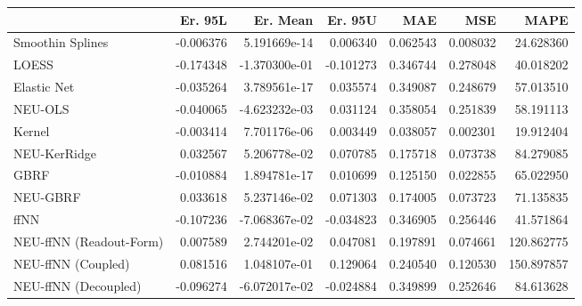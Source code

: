 \begin{tabular}{lrrrrrr}
\toprule
{} &   Er. 95L &      Er. Mean &   Er. 95U &       MAE &       MSE &        MAPE \\
\midrule
Smoothin Splines        & -0.006376 &  5.191669e-14 &  0.006340 &  0.062543 &  0.008032 &   24.628360 \\
LOESS                   & -0.174348 & -1.370300e-01 & -0.101273 &  0.346744 &  0.278048 &   40.018202 \\
Elastic Net             & -0.035264 &  3.789561e-17 &  0.035574 &  0.349087 &  0.248679 &   57.013510 \\
NEU-OLS                 & -0.040065 & -4.623232e-03 &  0.031124 &  0.358054 &  0.251839 &   58.191113 \\
Kernel                  & -0.003414 &  7.701176e-06 &  0.003449 &  0.038057 &  0.002301 &   19.912404 \\
NEU-KerRidge            &  0.032567 &  5.206778e-02 &  0.070785 &  0.175718 &  0.073738 &   84.279085 \\
GBRF                    & -0.010884 &  1.894781e-17 &  0.010699 &  0.125150 &  0.022855 &   65.022950 \\
NEU-GBRF                &  0.033618 &  5.237146e-02 &  0.071303 &  0.174005 &  0.073723 &   71.135835 \\
ffNN                    & -0.107236 & -7.068367e-02 & -0.034823 &  0.346905 &  0.256446 &   41.571864 \\
NEU-ffNN (Readout-Form) &  0.007589 &  2.744201e-02 &  0.047081 &  0.197891 &  0.074661 &  120.862775 \\
NEU-ffNN (Coupled)      &  0.081516 &  1.048107e-01 &  0.129064 &  0.240540 &  0.120530 &  150.897857 \\
NEU-ffNN (Decoupled)    & -0.096274 & -6.072017e-02 & -0.024884 &  0.349899 &  0.252646 &   84.613628 \\
\bottomrule
\end{tabular}
